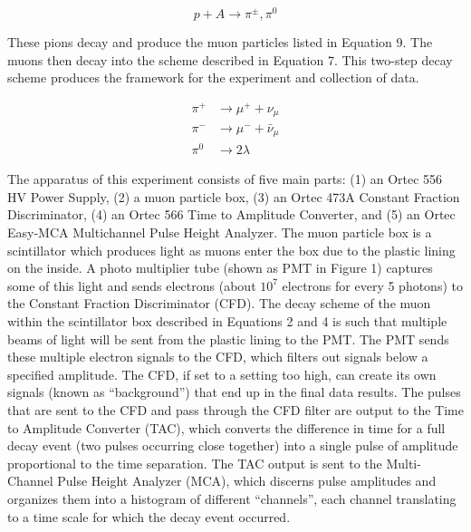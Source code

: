 \documentclass[%
 aip,
 amsmath,amssymb,
 reprint,%
floatfix,
]{revtex4-1}
\begin{document}
\begin{equation}
	p + A \rightarrow \pi^{\pm}, \pi^0
\end{equation}

These pions decay and produce the muon particles listed in Equation 9. The muons then decay into the scheme described in Equation 7. This two-step decay scheme produces the framework for the experiment and collection of data.

\begin{equation}
	\begin{aligned}
		\pi^+ & \rightarrow \mu^+ + \nu_{\mu} \\
		\pi^- & \rightarrow \mu^- + \bar{\nu}_{\mu} \\
		\pi^0 & \rightarrow 2\lambda
	\end{aligned}
\end{equation}


The apparatus of this experiment consists of five main parts: (1) an Ortec 556 HV Power Supply, (2) a muon particle box, (3) an Ortec 473A Constant Fraction Discriminator, (4) an Ortec 566 Time to Amplitude Converter, and (5) an Ortec Easy-MCA Multichannel Pulse Height Analyzer. The muon particle box is a scintillator which produces light as muons enter the box due to the plastic lining on the inside. A photo multiplier tube (shown as PMT in Figure 1) captures some of this light and sends electrons (about $10^7$ electrons for every 5 photons) to the Constant Fraction Discriminator (CFD). The decay scheme of the muon within the scintillator box described in Equations 2 and 4 is such that multiple beams of light will be sent from the plastic lining to the PMT. The PMT sends these multiple electron signals to the CFD, which filters out signals below a specified amplitude. The CFD, if set to a setting too high, can create its own signals (known as “background”) that end up in the final data results. The pulses that are sent to the CFD and pass through the CFD filter are output to the Time to Amplitude Converter (TAC), which converts the difference in time for a full decay event (two pulses occurring close together) into a single pulse of amplitude proportional to the time separation. The TAC output is sent to the Multi-Channel Pulse Height Analyzer (MCA), which discerns pulse amplitudes and organizes them into a histogram of different “channels”, each channel translating to a time scale for which the decay event occurred.
\end{document}
